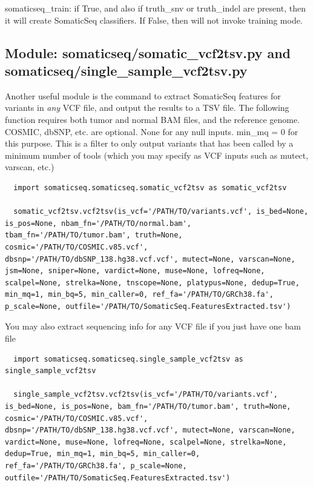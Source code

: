 \documentclass[10pt,letterpaper]{article}
\begin{document}
\begin{sloppypar}
\begin{itemize}
somaticseq\_train: if True, and also if truth\_snv or truth\_indel are present, then it will create SomaticSeq classifiers. If False, then will not invoke training mode. 

\end{itemize}





\subsection{Module: somaticseq/somatic\_vcf2tsv.py and somaticseq/single\_sample\_vcf2tsv.py} \label{module:vcf2tsv}

Another useful module is the command to extract SomaticSeq features for variants in \emph{any} VCF file, and output the results to a TSV file. The following function requires both tumor and normal BAM files, and the reference genome. COSMIC, dbSNP, etc. are optional. None for any null inputs. min\_mq = 0 for this purpose. This is a filter to only output variants that has been called by a minimum number of tools (which you may specify as VCF inputs such as mutect, varscan, etc.)

\begin{lstlisting}
  import somaticseq.somaticseq.somatic_vcf2tsv as somatic_vcf2tsv
  
  somatic_vcf2tsv.vcf2tsv(is_vcf='/PATH/TO/variants.vcf', is_bed=None, is_pos=None, nbam_fn='/PATH/TO/normal.bam', tbam_fn='/PATH/TO/tumor.bam', truth=None, cosmic='/PATH/TO/COSMIC.v85.vcf', dbsnp='/PATH/TO/dbSNP_138.hg38.vcf.vcf', mutect=None, varscan=None, jsm=None, sniper=None, vardict=None, muse=None, lofreq=None, scalpel=None, strelka=None, tnscope=None, platypus=None, dedup=True, min_mq=1, min_bq=5, min_caller=0, ref_fa='/PATH/TO/GRCh38.fa', p_scale=None, outfile='/PATH/TO/SomaticSeq.FeaturesExtracted.tsv')
\end{lstlisting}

You may also extract sequencing info for any VCF file if you just have one bam file

\begin{lstlisting}
  import somaticseq.somaticseq.single_sample_vcf2tsv as single_sample_vcf2tsv
  
  single_sample_vcf2tsv.vcf2tsv(is_vcf='/PATH/TO/variants.vcf', is_bed=None, is_pos=None, bam_fn='/PATH/TO/tumor.bam', truth=None, cosmic='/PATH/TO/COSMIC.v85.vcf', dbsnp='/PATH/TO/dbSNP_138.hg38.vcf.vcf', mutect=None, varscan=None, vardict=None, muse=None, lofreq=None, scalpel=None, strelka=None, dedup=True, min_mq=1, min_bq=5, min_caller=0, ref_fa='/PATH/TO/GRCh38.fa', p_scale=None, outfile='/PATH/TO/SomaticSeq.FeaturesExtracted.tsv')
\end{lstlisting}


\end{sloppypar}
\end{document}
